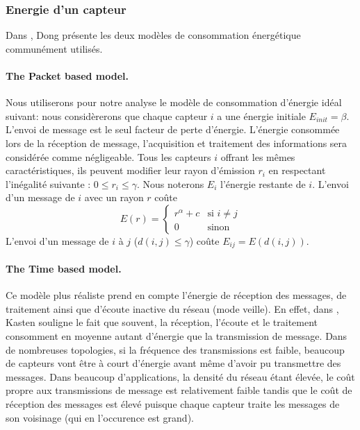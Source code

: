 \subsubsection{Energie d'un capteur}
Dans \cite{Dong2005}, Dong présente les deux modèles de consommation énergétique communément utilisés.
\paragraph{The Packet based model.\label{packet_based_model}}
Nous utiliserons pour notre analyse le modèle de consommation d'énergie idéal suivant:
nous considèrerons que chaque capteur $i$ a une énergie initiale $E_{init}=\beta$.
L'envoi de message est le seul facteur de perte d'énergie. L'énergie consommée lors de la réception de message, l'acquisition et traitement des informations sera considérée comme négligeable.
Tous les capteurs $i$ offrant les mêmes caractéristiques, ils peuvent modifier leur rayon d'émission $r_i$ en respectant l'inégalité suivante : $0 \leq r_i \leq \gamma$.
Nous noterons $E_i$ l'énergie restante de $i$.
L'envoi d'un message de $i$ avec un rayon $r$ coûte $$ E(r)= \begin{cases} r^\alpha + c & \text{si }i\neq j \\ 0 & \text{sinon}  \end{cases}$$
L'envoi d'un message de $i$ à $j$ ($d(i,j)\leq \gamma$) coûte  $ E_{ij}=E(d(i,j))$.

\paragraph{The Time based model.}
Ce modèle plus réaliste prend en compte l'énergie de réception des messages, de traitement ainsi que d'écoute inactive du réseau (mode veille).
En effet, dans \cite{Kasten2001}, Kasten souligne le fait que souvent, la réception, l'écoute et le traitement consomment en moyenne autant d'énergie que la transmission de message.
Dans de nombreuses topologies, si la fréquence des transmissions est faible, beaucoup de capteurs vont être à court d'énergie avant même d'avoir pu transmettre des messages.
Dans beaucoup d'applications, la densité du réseau étant élevée, le coût propre aux transmissions de message est relativement faible tandis que le coût de réception des messages est élevé puisque chaque capteur traite les messages de son voisinage (qui en l'occurence est grand).



